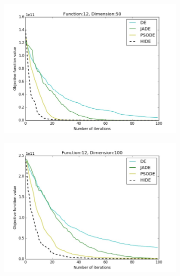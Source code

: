 \documentclass[a4paper,twoside]{article}
\begin{document}
\begin{figure}[h!]
    \begin{subfigure}[b]{0.24\textwidth}
        \includegraphics[width=\textwidth,natwidth=800,natheight=600]{plot_50D_F12_save}
        \caption{}
    \end{subfigure}
    \begin{subfigure}[b]{0.24\textwidth}
        \includegraphics[width=\textwidth,natwidth=800,natheight=600]{plot_100D_F12_save}
        \caption{}
    \end{subfigure}
    \begin{subfigure}[b]{0.24\textwidth}

\end{subfigure}
\end{figure}
\end{document}
